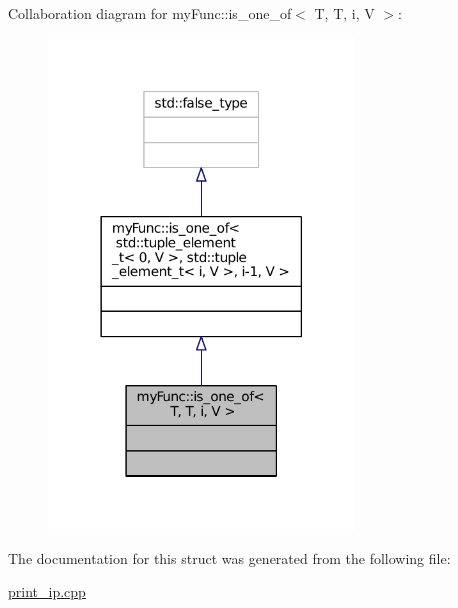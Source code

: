 Collaboration diagram for my\+Func\+:\+:is\+\_\+one\+\_\+of$<$ T, T, i, V $>$\+:
\nopagebreak
\begin{figure}[H]
\begin{center}
\leavevmode
\includegraphics[width=230pt]{structmyFunc_1_1is__one__of_3_01T_00_01T_00_01i_00_01V_01_4__coll__graph}
\end{center}
\end{figure}


The documentation for this struct was generated from the following file\+:\begin{DoxyCompactItemize}
\item 
\hyperlink{print__ip_8cpp}{print\+\_\+ip.\+cpp}\end{DoxyCompactItemize}
